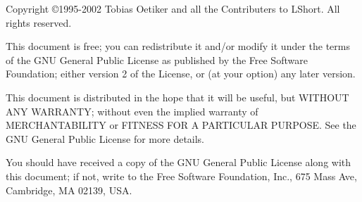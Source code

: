 
\ifx\pdfoutput\undefined %
\else
{}
\fi
\newlength{\centeroffset}
\setlength{\centeroffset}{-0.5\oddsidemargin}
\addtolength{\centeroffset}{0.5\evensidemargin}
\thispagestyle{empty}
\noindent\hspace*{\centeroffset}

\noindent\hspace*{\centeroffset}



\pagebreak
\begin{small} 
  Copyright \copyright 1995-2002 Tobias Oetiker and all the Contributers to
  LShort.  All rights reserved.
 
  This document is free; you can redistribute it and/or modify it
  under the terms of the GNU General Public License as published by
  the Free Software Foundation; either version 2 of the License, or
  (at your option) any later version.
  
  This document is distributed in the hope that it will be useful, but
  WITHOUT ANY WARRANTY; without even the implied warranty of
  MERCHANTABILITY or FITNESS FOR A PARTICULAR PURPOSE\@.  See the GNU
  General Public License for more details.
  
  You should have received a copy of the GNU General Public License
  along with this document; if not, write to the Free Software
  Foundation, Inc., 675 Mass Ave, Cambridge, MA 02139, USA.

\end{small}


\endinput

%

